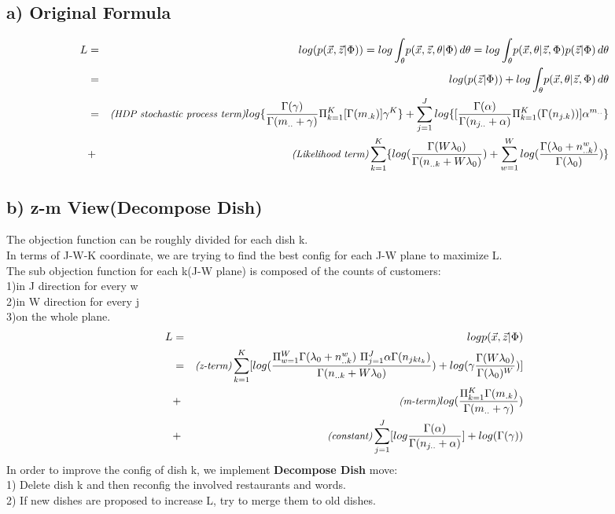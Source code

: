 \documentclass{article}
\begin{document}
\begin{spacing}{1.1}
\subsection{a) Original Formula}
\begin{eqnarray*}
L&=&log(p(\vec x,\vec z|\Phi))=log\int_\theta \! p(\vec x,\vec z,\theta|\Phi)\, d\theta=log\int_\theta \! p(\vec x,\theta|\vec z,\Phi)p(\vec z|\Phi) \, d\theta\\
&=&log(p(\vec z|\Phi))+log\int_\theta \! p(\vec x,\theta|\vec z,\Phi) \, d\theta\\
&=&\emph{{\small(HDP stochastic process term)}}log\{\frac{\Gamma(\gamma)}{\Gamma(m_{..}+\gamma)}\Pi_{k=1}^{K} [\Gamma(m_{.k})] \gamma^{K}\}+\sum_{j=1}^{J}log\{[\frac{\Gamma(\alpha)}{\Gamma(n_{j..}+\alpha)}\Pi_{k=1}^{K}(\Gamma(n_{j.k}))]\alpha^{m_{..}}\}\\
&+&\emph{{\small(Likelihood term)}}\sum_{k=1}^{K}\{log(\frac{\Gamma(W\lambda_{0})}{\Gamma(n_{..k}+W\lambda_{0})})+\sum_{w=1}^{W}log(\frac{\Gamma(\lambda_{0}+n_{..k}^{w})}{\Gamma(\lambda_{0})})\}
\end{eqnarray*}


\subsection{b) z-m View(Decompose Dish)}
The objection function can be roughly divided for each dish k.\\ 
In terms of J-W-K coordinate, we are trying to find the best config for each J-W plane to maximize L.\\
The sub objection function for each k(J-W plane) is composed of the counts of customers:\\ 
1)in J direction for every w\\
2)in W direction for every j\\
3)on the whole plane.
\begin{eqnarray*}
L&=&log p(\vec x,\vec z|\Phi)\\
&=&\emph{{\small(z-term)}}\sum_{k=1}^{K} [log(\frac{\Pi_{w=1}^{W}\Gamma(\lambda_{0}+n_{..k}^{w})\ \Pi_{j=1}^{J}\alpha\Gamma(n_{jkt_{k}})}{\Gamma(n_{..k}+W\lambda_{0})})+log(\gamma \frac{\Gamma(W\lambda_{0})}{\Gamma(\lambda_{0})^{W}})]\\
&+&\emph{{\small(m-term)}}log(\frac{\Pi_{k=1}^{K}\Gamma(m_{.k})}{\Gamma(m_{..}+\gamma)})\\
&+&\emph{{\small(constant)}}\sum_{j=1}^{J} [log \frac{\Gamma(\alpha)}{\Gamma(n_{j..}+\alpha)}]+log(\Gamma(\gamma))\\ 
\end{eqnarray*}
In order to improve the config of dish k, we implement {\bf Decompose Dish} move:\\
1) Delete dish k and then reconfig the involved restaurants and words.\\
2) If new dishes are proposed to increase L, try to merge them to old dishes.\\

\end{spacing}
\end{document}
